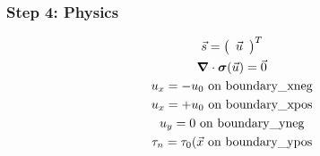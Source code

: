 \documentclass[aspectratio=169]{beamer}
\begin{document}
\begin{frame}
  \frametitle{Step 4: Physics}
  \summary{}

  \begin{minipage}{0.3\textwidth}
    {\scriptsize
      \begin{gather*}
        \vec{s} = \left(\begin{array}{c} \vec{u} \end{array}\right)^T \\
        \bm{\nabla} \cdot \bm{\sigma}(\vec{u}) = \vec{0} \\
        u_x = -u_0 \text{ on boundary\_xneg} \\
        u_x = +u_0 \text{ on boundary\_xpos} \\
        u_y = 0 \text{ on boundary\_yneg} \\
        \tau_n = \tau_0(\vec{x} \text{ on boundary\_ypos}
    \end{gather*}}
  \end{minipage}
  \hfill
  \begin{minipage}{0.67\textwidth}
  \end{minipage}
      
\end{frame}
\end{document}
